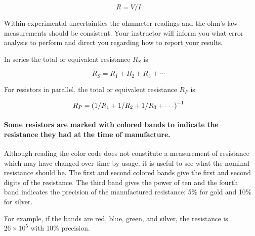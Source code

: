 \begin{multicols}{2}
\begin{equation} R = V/I \label{e:ohm} \end{equation}


Within experimental uncertainties the ohmmeter readings and the ohm's law measurements should be consistent.  Your instructor will inform you what error analysis to perform and direct you regarding how to report your results.

In series the total or equivalent resistance $R_S$ is 

\begin{equation} \label{e:ser}
	R_S  =  R_1  +  R_2  +  R_3  + \cdots	
\end{equation}

For resistors in parallel, the total or equivalent resistance $R_P$ is

\begin{equation} \label{e:par}
	R_P  =  \left (1/R_1  +  1/R_2  +  1/R_3  + \cdots \right)\relax^{-1}
\end{equation}

\paragraph {Some resistors are marked with colored bands to indicate the resistance they had at the time of manufacture.}  Although reading the color code does not constitute a measurement of resistance which may have changed over time by usage, it is useful to see what the nominal resistance should be.  The first and second colored bands give the first and second digits of the resistance.  The third band gives the power of ten and the fourth band indicates the precision of the manufactured resistance:  5\% for gold and  10\% for silver.

For example, if the bands are red, blue, green, and silver, the resistance is $26 \times 10^5$ with 10\% precision.


\end{multicols}
